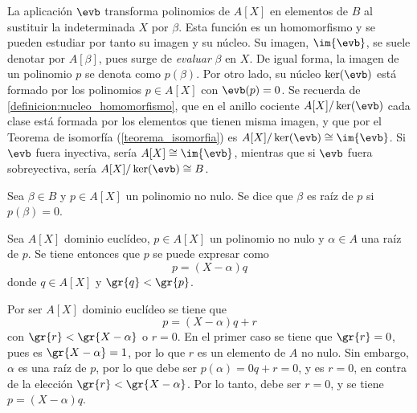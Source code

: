 \begin{obs}
    La aplicación $\evb$ transforma polinomios de $A[X]$ en elementos de $B$ al sustituir la indeterminada $X$ por $\beta$. Esta función es un homomorfismo y se pueden estudiar por tanto su imagen y su núcleo. Su imagen, $\im{\evb}$, se suele denotar por $A[\beta]$, pues surge de \textit{evaluar} $\beta$ en $X$. De igual forma, la imagen de un polinomio $p$ se denota como $p(\beta)$. Por otro lado, su núcleo $\ker (\evb)$ está formado por los polinomios $p\in A[X]$ con $\evb(p) = 0$. Se recuerda de \ref{definicion:nucleo_homomorfismo}, que en el anillo cociente $A[X]/\ker (\evb)$ cada clase está formada por los elementos que tienen misma imagen, y que por el Teorema de isomorfía (\ref{teorema_isomorfia}) es $A[X]/\ker (\evb) \cong \im{\evb}$. Si $\evb$ fuera inyectiva, sería $A[X] \cong \im{\evb}$, mientras que si $\evb$ fuera sobreyectiva, sería $A[X]/\ker (\evb) \cong B$.
\end{obs}


\begin{deff}{\cite[p.~113]{GamboaAnillos}}
    Sea $\beta \in B$ y $p\in A[X]$ un polinomio no nulo. Se dice que $\beta$ es raíz de $p$ si $p(\beta) = 0$. 
\end{deff}

\begin{lema}{}\label{lema:rufini}
    Sea $A[X]$ dominio euclídeo, $p\in A[X]$ un polinomio no nulo y $\alpha\in A$ una raíz de $p$. Se tiene entonces que $p$ se puede expresar como \[p = (X-\alpha)q\] donde $q\in A[X]$ y $\gr{q} < \gr{p}$.
\end{lema}

\begin{dem}{\cite[pp.~54-55]{Rosenberger}}
    Por ser $A[X]$ dominio euclídeo se tiene que \[p = (X-\alpha)q + r\] con $\gr{r} < \gr{X-\alpha}$ o $r = 0$. En el primer caso se tiene que $\gr{r} = 0$, pues es $\gr{X-\alpha} = 1$, por lo que $r$ es un elemento de $A$ no nulo. Sin embargo, $\alpha$ es una raíz de $p$, por lo que debe ser $p(\alpha) = 0q + r = 0$, y es $r = 0$, en contra de la elección $\gr{r} < \gr{X-\alpha}$. Por lo tanto, debe ser $r = 0$, y se tiene $p = (X-\alpha)q$.
\end{dem}

